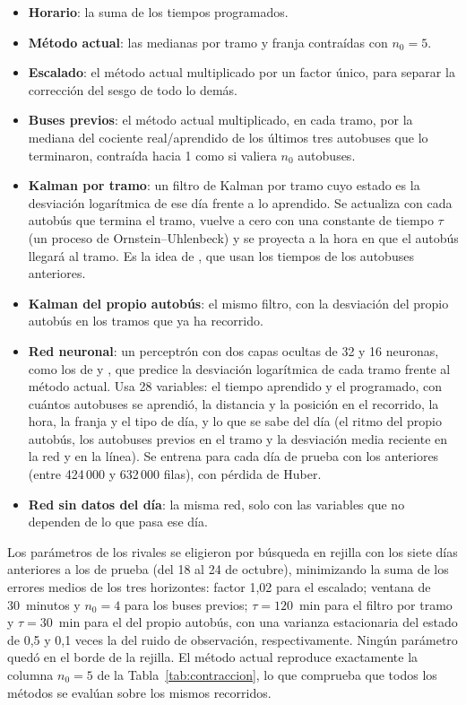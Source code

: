 \begin{itemize}
  \item \textbf{Horario}: la suma de los tiempos programados.
  \item \textbf{Método actual}: las medianas por tramo y franja contraídas con $n_0=5$.
  \item \textbf{Escalado}: el método actual multiplicado por un factor único, para separar la corrección del sesgo de
        todo lo demás.
  \item \textbf{Buses previos}: el método actual multiplicado, en cada tramo, por la mediana del cociente real/aprendido
        de los últimos tres autobuses que lo terminaron, contraída hacia 1 como si valiera $n_0$ autobuses.
  \item \textbf{Kalman por tramo}: un filtro de Kalman \citep{kalman1960} por tramo cuyo estado es la desviación
        logarítmica de ese día frente a lo aprendido. Se actualiza con cada autobús que termina el tramo, vuelve a cero
        con una constante de tiempo $\tau$ (un proceso de Ornstein--Uhlenbeck) y se proyecta a la hora en que el autobús
        llegará al tramo. Es la idea de \citet{shalaby2004}, que usan los tiempos de los autobuses anteriores.
  \item \textbf{Kalman del propio autobús}: el mismo filtro, con la desviación del propio autobús en los tramos que ya
        ha recorrido.
  \item \textbf{Red neuronal}: un perceptrón con dos capas ocultas de 32 y 16 neuronas, como los de \citet{chien2002}
        y \citet{jeong2005}, que predice la desviación logarítmica de cada tramo frente al método actual. Usa 28
        variables: el tiempo aprendido y el programado, con cuántos autobuses se aprendió, la distancia y la posición en
        el recorrido, la hora, la franja y el tipo de día, y lo que se sabe del día (el ritmo del propio autobús, los
        autobuses previos en el tramo y la desviación media reciente en la red y en la línea). Se entrena para cada día
        de prueba con los anteriores (entre 424\,000 y 632\,000 filas), con pérdida de Huber.
  \item \textbf{Red sin datos del día}: la misma red, solo con las variables que no dependen de lo que pasa ese día.
\end{itemize}

\noindent Los parámetros de los rivales se eligieron por búsqueda en rejilla con los siete días anteriores a los de
prueba (del 18 al 24 de octubre), minimizando la suma de los errores medios de los tres horizontes: factor 1,02 para el escalado;
ventana de 30~minutos y $n_0=4$ para los buses previos; $\tau=120$~min para el filtro por tramo y $\tau=30$~min para
el del propio autobús, con una varianza estacionaria del estado de 0,5 y 0,1 veces la del ruido de observación, respectivamente. Ningún
parámetro quedó en el borde de la rejilla. El método actual reproduce exactamente la columna $n_0=5$ de la
Tabla~\ref{tab:contraccion}, lo que comprueba que todos los métodos se evalúan sobre los mismos recorridos.

